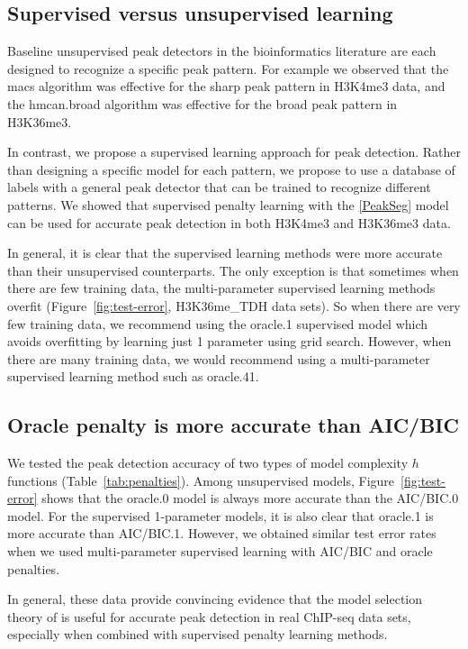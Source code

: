 \documentclass{article}
\begin{document}
\subsection{Supervised versus unsupervised learning}

Baseline unsupervised peak detectors in the bioinformatics literature
are each designed to recognize a specific peak pattern. For example we
observed that the macs algorithm was effective for the sharp peak
pattern in H3K4me3 data, and the hmcan.broad algorithm was effective
for the broad peak pattern in H3K36me3.

In contrast, we propose a supervised learning approach for peak
detection. Rather than designing a specific model for each pattern, we
propose to use a database of labels with a general peak detector that
can be trained to recognize different patterns. We showed that
supervised penalty learning with the \ref{PeakSeg} model can be used
for accurate peak detection in both H3K4me3 and H3K36me3 data.

In general, it is clear that the supervised learning methods were more
accurate than their unsupervised counterparts. The only exception is
that sometimes when there are few training data, the multi-parameter
supervised learning methods overfit (Figure~\ref{fig:test-error},
H3K36me\_TDH data sets). So when there are very few training data, we
recommend using the oracle.1 supervised model which avoids overfitting
by learning just 1 parameter using grid search. However, when there
are many training data, we would recommend using a multi-parameter
supervised learning method such as oracle.41.

\subsection{Oracle penalty is more accurate than AIC/BIC}

We tested the peak detection accuracy of two types of model complexity
$h$ functions (Table~\ref{tab:penalties}). Among unsupervised models,
Figure~\ref{fig:test-error} shows that the oracle.0 model is always
more accurate than the AIC/BIC.0 model. For the supervised 1-parameter
models, it is also clear that oracle.1 is more accurate than
AIC/BIC.1. However, we obtained similar test error rates when we used
multi-parameter supervised learning with AIC/BIC and oracle
penalties.

In general, these data provide convincing evidence that the model
selection theory of \citet{cleynen2013segmentation} is useful for
accurate peak detection in real ChIP-seq data sets, especially when
combined with supervised penalty learning methods.
\end{document}
